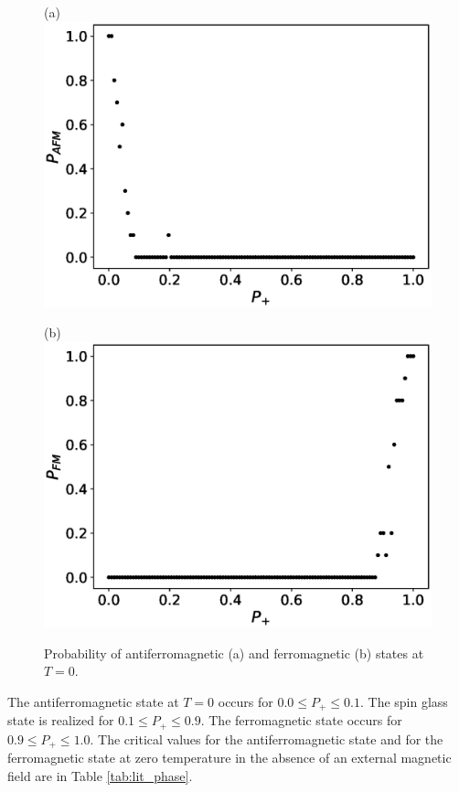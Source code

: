 \documentclass[preprint,12pt]{elsarticle}
\begin{document}
	\begin{figure}[H]
		\begin{minipage}[h]{0.45\linewidth}
			\centering (a)
			\includegraphics[width=1\linewidth]{images/P_AFM_Mmax.eps}
		\end{minipage}
		\hfill
		\begin{minipage}[h]{0.45\linewidth}
			\centering (b)
			\includegraphics[width=1\linewidth]{images/P_FM_Mmax.eps}
		\end{minipage}
		\caption{Probability of antiferromagnetic (a) and ferromagnetic (b) states at \( T = 0 \).}
		\label{fig:P_AFM_FM_Mmax}
	\end{figure}
	
	The antiferromagnetic state at $T = 0$ occurs for $0.0 \leq P_+ \leq 0.1$. The spin glass state is realized for $0.1 \leq P_+ \leq 0.9$. The ferromagnetic state occurs for $0.9 \leq P_+ \leq 1.0$. The critical values for the antiferromagnetic state and for the ferromagnetic state at zero temperature in the absence of an external magnetic field are in Table \ref{tab:lit_phase}.
	
\end{document}
